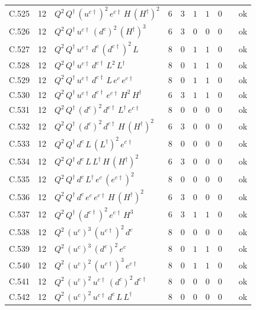 {\begin{longtable}{@{}ll>{\raggedright\arraybackslash}p{6.4cm}rrllllr@{}}
C.525 & 12 & $Q^{2}\,Q^\dagger\,(u^{c\dagger})^{2}\,e^{c\dagger}\,H\,(H^\dagger)^{2}$ & 6 & 3 & $1$ & $1$ & $0$ &  & ok \\
C.526 & 12 & $Q^{2}\,Q^\dagger\,u^{c\dagger}\,(d^c)^{2}\,(H^\dagger)^{3}$ & 6 & 3 & $0$ & $0$ & $0$ &  & ok \\
C.527 & 12 & $Q^{2}\,Q^\dagger\,u^{c\dagger}\,d^c\,(d^{c\dagger})^{2}\,L$ & 8 & 0 & $1$ & $1$ & $0$ &  & ok \\
C.528 & 12 & $Q^{2}\,Q^\dagger\,u^{c\dagger}\,d^{c\dagger}\,L^{2}\,L^\dagger$ & 8 & 0 & $1$ & $1$ & $0$ &  & ok \\
C.529 & 12 & $Q^{2}\,Q^\dagger\,u^{c\dagger}\,d^{c\dagger}\,L\,e^c\,e^{c\dagger}$ & 8 & 0 & $1$ & $1$ & $0$ &  & ok \\
C.530 & 12 & $Q^{2}\,Q^\dagger\,u^{c\dagger}\,d^{c\dagger}\,e^{c\dagger}\,H^{2}\,H^\dagger$ & 6 & 3 & $1$ & $1$ & $0$ &  & ok \\
C.531 & 12 & $Q^{2}\,Q^\dagger\,(d^c)^{2}\,d^{c\dagger}\,L^\dagger\,e^{c\dagger}$ & 8 & 0 & $0$ & $0$ & $0$ &  & ok \\
C.532 & 12 & $Q^{2}\,Q^\dagger\,(d^c)^{2}\,d^{c\dagger}\,H\,(H^\dagger)^{2}$ & 6 & 3 & $0$ & $0$ & $0$ &  & ok \\
C.533 & 12 & $Q^{2}\,Q^\dagger\,d^c\,L\,(L^\dagger)^{2}\,e^{c\dagger}$ & 8 & 0 & $0$ & $0$ & $0$ &  & ok \\
C.534 & 12 & $Q^{2}\,Q^\dagger\,d^c\,L\,L^\dagger\,H\,(H^\dagger)^{2}$ & 6 & 3 & $0$ & $0$ & $0$ &  & ok \\
C.535 & 12 & $Q^{2}\,Q^\dagger\,d^c\,L^\dagger\,e^c\,(e^{c\dagger})^{2}$ & 8 & 0 & $0$ & $0$ & $0$ &  & ok \\
C.536 & 12 & $Q^{2}\,Q^\dagger\,d^c\,e^c\,e^{c\dagger}\,H\,(H^\dagger)^{2}$ & 6 & 3 & $0$ & $0$ & $0$ &  & ok \\
C.537 & 12 & $Q^{2}\,Q^\dagger\,(d^{c\dagger})^{2}\,e^{c\dagger}\,H^{3}$ & 6 & 3 & $1$ & $1$ & $0$ &  & ok \\
C.538 & 12 & $Q^{2}\,(u^c)^{3}\,(u^{c\dagger})^{2}\,d^c$ & 8 & 0 & $0$ & $0$ & $0$ &  & ok \\
C.539 & 12 & $Q^{2}\,(u^c)^{3}\,(d^c)^{2}\,e^c$ & 8 & 0 & $1$ & $1$ & $0$ &  & ok \\
C.540 & 12 & $Q^{2}\,(u^c)^{2}\,(u^{c\dagger})^{3}\,e^{c\dagger}$ & 8 & 0 & $1$ & $1$ & $0$ &  & ok \\
C.541 & 12 & $Q^{2}\,(u^c)^{2}\,u^{c\dagger}\,(d^c)^{2}\,d^{c\dagger}$ & 8 & 0 & $0$ & $0$ & $0$ &  & ok \\
C.542 & 12 & $Q^{2}\,(u^c)^{2}\,u^{c\dagger}\,d^c\,L\,L^\dagger$ & 8 & 0 & $0$ & $0$ & $0$ &  & ok \\

\end{longtable}}
